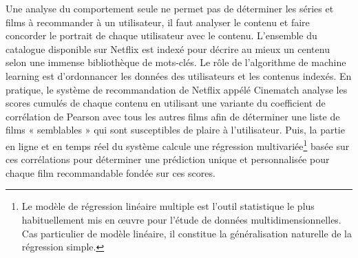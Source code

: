 \vspace{5mm}

Une analyse du comportement seule ne permet pas de déterminer les séries et films à recommander à un utilisateur, il faut analyser le contenu et faire concorder le portrait de chaque utilisateur avec le contenu. L'ensemble du catalogue disponible sur Netflix est indexé pour décrire au mieux un centenu selon une immense bibliothèque de mots-clés. Le rôle de l'algorithme de machine learning est d'ordonnancer les données des utilisateurs et les contenus indexés. En pratique, le système de recommandation de Netflix appélé Cinematch analyse les scores cumulés de chaque contenu en utilisant une variante du coefficient de corrélation de Pearson avec tous les autres films afin de déterminer une liste de films « semblables » qui sont susceptibles de plaire à l'utilisateur. Puis, la partie en ligne et en temps réel du système calcule une régression multivariée\footnote{Le modèle de régression linéaire multiple est l’outil statistique le plus habituellement mis en œuvre pour l’étude de données multidimensionnelles. Cas
particulier de modèle linéaire, il constitue la généralisation naturelle de la régression simple.} basée sur ces corrélations pour déterminer une prédiction unique et personnalisée pour chaque film recommandable fondée sur ces scores.

